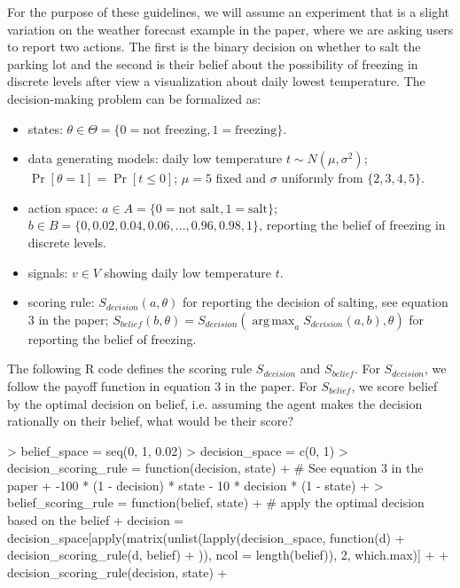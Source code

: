 \documentclass{article}
\DeclareMathOperator*{\argmax}{arg\,max}
\begin{document}
For the purpose of these guidelines, we will assume an experiment that is a slight variation on the weather forecast example in the paper, where we are asking users to report two actions. The first is the binary decision on whether to salt the parking lot and the second is their belief about the possibility of freezing in discrete levels after view a visualization about daily lowest temperature. The decision-making problem can be formalized as:

\begin{itemize}
    \item states: $\theta \in \Theta = \{0=\text{not freezing}, 1=\text{freezing}\}$.
    \item data generating models: daily low temperature $t \sim N(\mu, \sigma^2)$; $\Pr[\theta = 1] = \Pr[t \leq 0]$; $\mu = 5$ fixed and $\sigma$ uniformly from $\{2, 3, 4, 5\}$.
    \item action space: $a \in A = \{0 = \text{not salt}, 1 = \text{salt}\}$; $b \in B = \{0, 0.02, 0.04, 0.06, ..., 0.96, 0.98, 1\}$, reporting the belief of freezing in discrete levels.
    \item signals: $v \in V$ showing daily low temperature $t$.
    \item scoring rule: $S_{decision}(a, \theta)$ for reporting the decision of salting, see equation 3 in the paper; $S_{belief}(b, \theta) = S_{decision}(\argmax_{a}{S_{decision}(a, b)}, \theta)$ for reporting the belief of freezing.
\end{itemize}

The following R code defines the scoring rule $S_{decision}$ and $S_{belief}$. For $S_{decision}$, we follow the payoff function in equation 3 in the paper. For $S_{belief}$, we score belief by the optimal decision on belief, i.e. assuming the agent makes the decision rationally on their belief, what would be their score?

\begin{Schunk}
\begin{Sinput}
> belief_space = seq(0, 1, 0.02)
> decision_space = c(0, 1)
> decision_scoring_rule = function(decision, state) {
+   # See equation 3 in the paper
+   -100 * (1 - decision) * state - 10 * decision * (1 - state)
+ }
> belief_scoring_rule = function(belief, state) {
+   # apply the optimal decision based on the belief
+   decision = decision_space[apply(matrix(unlist(lapply(decision_space, function(d) {
+       decision_scoring_rule(d, belief)
+   })), ncol = length(belief)), 2, which.max)]
+   
+   decision_scoring_rule(decision, state)
+ }
\end{Sinput}
\end{Schunk}
\end{document}
